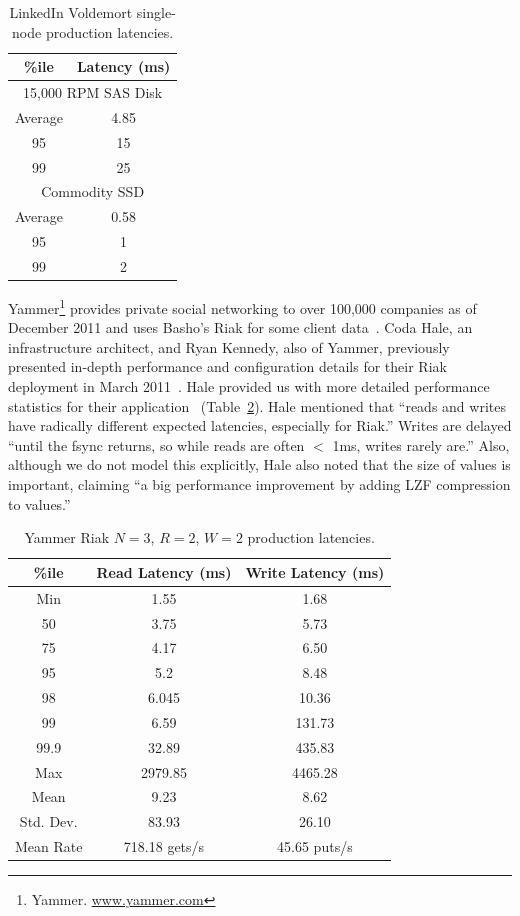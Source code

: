 \documentclass{vldb}
\begin{document}
\begin{table}
\centering
\begin{tabular}{|c|c|}
\hline
\%ile & Latency (ms) \\
\hline
\multicolumn{2}{|c|}{ 15,000 RPM SAS Disk}\\
\hline
Average & 4.85\\
95 & 15\\
99 & 25\\
\hline
\multicolumn{2}{|c|}{ Commodity SSD }\\
\hline
Average & 0.58 \\
95 & 1\\
99 & 2\\
\hline
\end{tabular}
\vspace{-6pt}
\caption{LinkedIn Voldemort single-node production latencies.}
\vspace{-4pt}
\label{table:linkedin}
\end{table}

Yammer\footnote{Yammer. \url{www.yammer.com}} provides private
social networking to over 100,000 companies as of December 2011 and
uses Basho's Riak for some client data~\cite{riak}.  Coda Hale, an
infrastructure architect, and Ryan Kennedy, also of Yammer, previously
presented in-depth performance and configuration details for their
Riak deployment in March 2011~\cite{riakyammer}.  Hale provided us
with more detailed performance statistics for their
application~\cite{codapc} (Table~\ref{table:yammer}).  Hale mentioned
that ``reads and writes have radically different expected latencies,
especially for Riak.''  Writes are delayed ``until the fsync returns,
so while reads are often $<$ 1ms, writes rarely are.''  Also, although
we do not model this explicitly, Hale also noted that the size of
values is important, claiming ``a big performance improvement by
adding LZF compression to values.''

\begin{table}
\centering
\begin{tabular}{|c|c|c|}
\hline
\%ile & Read Latency (ms) & Write Latency (ms)\\
\hline
Min & 1.55 & 1.68\\
50 & 3.75 & 5.73 \\
75 & 4.17 & 6.50\\
95 & 5.2 & 8.48\\
98 & 6.045 & 10.36 \\
99 & 6.59 & 131.73\\
99.9 & 32.89 & 435.83\\
Max & 2979.85 &  4465.28 \\
\hline
Mean & 9.23 & 8.62 \\
Std. Dev. & 83.93 & 26.10\\
\hline
Mean Rate & 718.18 gets/s & 45.65 puts/s\\
\hline
\end{tabular}
\vspace{-4pt}
\caption{Yammer Riak $N$$=$$3$, $R$$=$$2$, $W$$=$$2$ production latencies.}
\vspace{-12pt}
\label{table:yammer}
\end{table}
\end{document}
